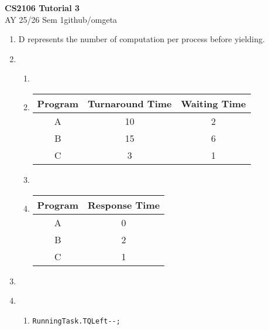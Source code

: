 \documentclass[12pt, a4paper]{article}
\newcommand{\mytitle}{CS2106 Tutorial 3}
\newcommand{\myauthor}{github/omgeta}
\newcommand{\mydate}{AY 25/26 Sem 1}
\begin{document}
\raggedright
\footnotesize
\begin{center}
{\normalsize{\textbf{\mytitle}}} \\
{\footnotesize{\mydate\hspace{2pt}\textemdash\hspace{2pt}\myauthor}}
\end{center}
\begin{enumerate}[Q\arabic*.]
  \item D represents the number of computation per process before yielding. 

  \item 
    \begin{enumerate}[(\alph*.)]
      \item \quad\\

      \item 
        \begin{tabular}{|c|c|c|}
        \hline
        Program & Turnaround Time & Waiting Time \\
        \hline
        A & 10 & 2 \\
        B & 15 & 6 \\
        C & 3  & 1 \\
        \hline
        \end{tabular}

      \item \quad\\

      \item 
        \begin{tabular}{|c|c|}
        \hline
        Program & Response Time \\
        \hline
        A & 0 \\
        B & 2 \\
        C & 1  \\
        \hline
        \end{tabular}
    \end{enumerate}
    
  \item \quad\\

  \item 
    \begin{enumerate}[(\alph*.)]
      \item 
        \begin{lstlisting}
RunningTask.TQLeft--;


\end{lstlisting}
\end{enumerate}
\end{enumerate}
\end{document}
